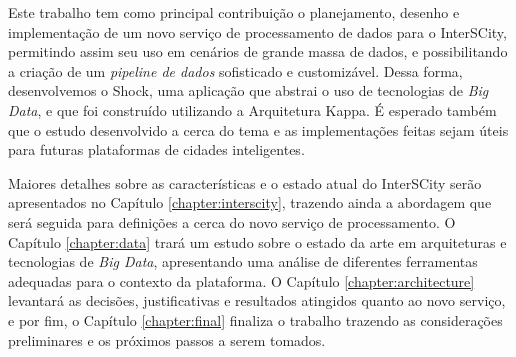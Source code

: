 Este trabalho tem como principal contribuição o planejamento, desenho e
implementação de um novo serviço de processamento de dados para o InterSCity,
permitindo assim seu uso em cenários de grande massa de dados, e possibilitando
a criação de um \textit{pipeline de dados} sofisticado e customizável. Dessa
forma, desenvolvemos o Shock, uma aplicação que abstrai o uso de tecnologias
de \textit{Big Data}, e que foi construído utilizando a Arquitetura Kappa. É
esperado também que o estudo desenvolvido a cerca do tema e as implementações
feitas sejam úteis para futuras plataformas de cidades inteligentes.

Maiores detalhes sobre as características e o estado atual do InterSCity serão
apresentados no Capítulo \ref{chapter:interscity}, trazendo ainda a abordagem que será
seguida para definições a cerca do novo serviço de processamento. O Capítulo
\ref{chapter:data} trará um estudo sobre o estado da arte em arquiteturas e
tecnologias de \textit{Big Data}, apresentando uma análise de diferentes ferramentas
adequadas para o contexto da plataforma. O Capítulo \ref{chapter:architecture}
levantará as decisões, justificativas e resultados atingidos quanto ao novo
serviço, e por fim, o Capítulo \ref{chapter:final} finaliza o trabalho
trazendo as considerações preliminares e os próximos passos a serem tomados.
